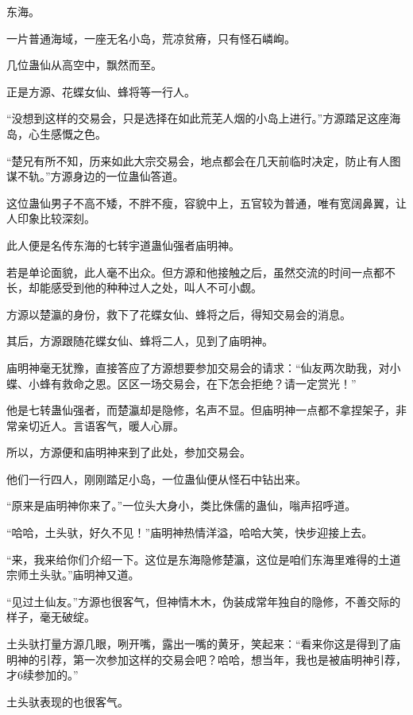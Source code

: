 
\begin{this_body}

东海。

一片普通海域，一座无名小岛，荒凉贫瘠，只有怪石嶙峋。

几位蛊仙从高空中，飘然而至。

正是方源、花蝶女仙、蜂将等一行人。

“没想到这样的交易会，只是选择在如此荒芜人烟的小岛上进行。”方源踏足这座海岛，心生感慨之色。

“楚兄有所不知，历来如此大宗交易会，地点都会在几天前临时决定，防止有人图谋不轨。”方源身边的一位蛊仙答道。

这位蛊仙男子不高不矮，不胖不瘦，容貌中上，五官较为普通，唯有宽阔鼻翼，让人印象比较深刻。

此人便是名传东海的七转宇道蛊仙强者庙明神。

若是单论面貌，此人毫不出众。但方源和他接触之后，虽然交流的时间一点都不长，却能感受到他的种种过人之处，叫人不可小觑。

方源以楚瀛的身份，救下了花蝶女仙、蜂将之后，得知交易会的消息。

其后，方源跟随花蝶女仙、蜂将二人，见到了庙明神。

庙明神毫无犹豫，直接答应了方源想要参加交易会的请求：“仙友两次助我，对小蝶、小蜂有救命之恩。区区一场交易会，在下怎会拒绝？请一定赏光！”

他是七转蛊仙强者，而楚瀛却是隐修，名声不显。但庙明神一点都不拿捏架子，非常亲切近人。言语客气，暖人心扉。

所以，方源便和庙明神来到了此处，参加交易会。

他们一行四人，刚刚踏足小岛，一位蛊仙便从怪石中钻出来。

“原来是庙明神你来了。”一位头大身小，类比侏儒的蛊仙，嗡声招呼道。

“哈哈，土头驮，好久不见！”庙明神热情洋溢，哈哈大笑，快步迎接上去。

“来，我来给你们介绍一下。这位是东海隐修楚瀛，这位是咱们东海里难得的土道宗师土头驮。”庙明神又道。

“见过土仙友。”方源也很客气，但神情木木，伪装成常年独自的隐修，不善交际的样子，毫无破绽。

土头驮打量方源几眼，咧开嘴，露出一嘴的黄牙，笑起来：“看来你这是得到了庙明神的引荐，第一次参加这样的交易会吧？哈哈，想当年，我也是被庙明神引荐，才6续参加的。”

土头驮表现的也很客气。


\end{this_body}
